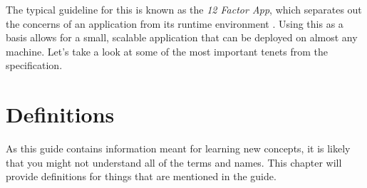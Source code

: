 \documentclass[12pt, oneside, a4paper]{book}
\begin{document}
      The typical guideline for this is known as the \textit{12 Factor App\footnotemark}, which separates out the concerns of an application from its runtime environment \autocite{wigginsTwelveFactorApp2017}.
      Using this as a basis allows for a small, scalable application that can be deployed on almost any machine.
      Let's take a look at some of the most important tenets from the specification.

   \chapter*{Definitions}
   \label{chap:definitions}
      As this guide contains information meant for learning new concepts, it is likely that you might not understand all of the terms and names.
      This chapter will provide definitions for things that are mentioned in the guide.

\newpage
{}
\printbibliography[title={Works Cited},heading=bibintoc]
\end{document}
